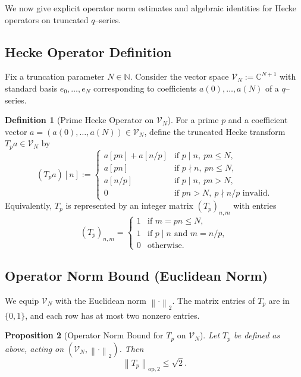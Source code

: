 \documentclass[11pt]{article}
\theoremstyle{definition}
\newtheorem{definition}{Definition}[section]
\theoremstyle{plain}
\newtheorem{proposition}[definition]{Proposition}
\theoremstyle{remark}
\newcommand{\Vcal}{\mathcal{V}}
\newcommand{\Nbb}{\mathbb{N}}
\newcommand{\Cbb}{\mathbb{C}}
\newcommand{\norm}[1]{\left\lVert #1 \right\rVert}
\begin{document}
We now give explicit operator norm estimates and algebraic identities for Hecke operators on truncated $q$--series.

\subsection{Hecke Operator Definition}

Fix a truncation parameter \(N \in \Nbb\).
Consider the vector space \(\Vcal_N := \Cbb^{N+1}\) with standard basis \(e_0,\dotsc,e_N\) corresponding to coefficients \(a(0),\dotsc,a(N)\) of a $q$--series.

\begin{definition}[Prime Hecke Operator on \(\Vcal_N\)]
For a prime \(p\) and a coefficient vector \(a = (a(0),\dotsc,a(N)) \in \Vcal_N\), define the truncated Hecke transform \(T_p a \in \Vcal_N\) by
\[
  (T_p a)[n] :=
  \begin{cases}
    a[pn] + a[n/p] &\text{if } p \mid n,\ pn \le N,\\[0.3em]
    a[pn] &\text{if } p \nmid n,\ pn \le N,\\[0.3em]
    a[n/p] &\text{if } p \mid n,\ pn > N,\\[0.3em]
    0 &\text{if } pn > N,\ p\nmid n/p \text{ invalid}.
  \end{cases}
\]
Equivalently, \(T_p\) is represented by an integer matrix \((T_p)_{n,m}\) with entries
\[
  (T_p)_{n,m} =
  \begin{cases}
    1 &\text{if } m = pn \le N,\\
    1 &\text{if } p\mid n \text{ and } m = n/p,\\
    0 &\text{otherwise}.
  \end{cases}
\]
\end{definition}

\subsection{Operator Norm Bound (Euclidean Norm)}

We equip \(\Vcal_N\) with the Euclidean norm \(\norm{\cdot}_2\).
The matrix entries of \(T_p\) are in \(\{0,1\}\), and each row has at most two nonzero entries.

\begin{proposition}[Operator Norm Bound for \(T_p\) on \(\Vcal_N\)]
Let \(T_p\) be defined as above, acting on \((\Vcal_N,\norm{\cdot}_2)\).
Then
\[
  \norm{T_p}_{\mathrm{op},2} \le \sqrt{2}.
\]
\end{proposition}
\end{document}
